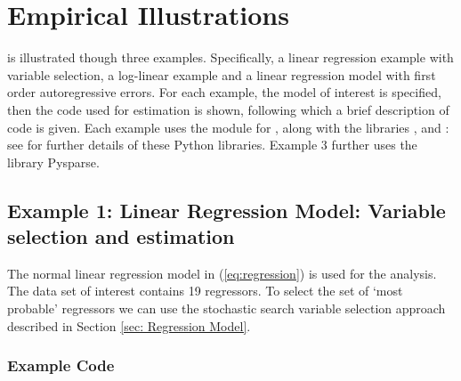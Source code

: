 \documentclass[article]{jss}
\begin{document}
\section{Empirical Illustrations}
\label{sec:Empirical-Illustrations}

 is illustrated though three examples. Specifically, a
linear regression example with variable selection, a log-linear
example and a linear regression model with first order autoregressive
errors.  For each example, the model of interest is specified, then the
code used for estimation is shown, following which a brief description
of code is given. Each example uses the module
for , along with the  libraries
,  and : see \citet{NumpyScipy, Matplotlib} for further details of these
Python libraries.
Example 3 further uses the library Pysparse.


\subsection{Example 1: Linear Regression Model: Variable selection and estimation}

The normal linear regression model in (\ref{eq:regression}) is used for the analysis.
The data set of interest contains 19 regressors. To select the set of `most probable' regressors we can use the
stochastic search variable selection approach described in Section \ref{sec: Regression Model}.

\subsubsection{Example Code}
\end{document}

